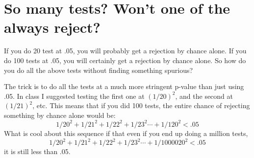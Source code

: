 \documentclass[12pt]{article}
\begin{document}
\section{So many tests?  Won't one of the always reject?}

If you do 20 test at .05, you will probably get a rejection by chance
alone.  If you do 100 tests at .05, you will certainly get a rejection
by chance alone.  So how do you do all the above tests without finding
something spurious?

The trick is to do all the tests at a much more stringent p-value than
just using .05.  In class I suggested testing the first one at
$(1/20)^2$, and the second at $(1/21)^2$, etc.  This means that if you
did 100 tests, the entire chance of rejecting something by chance
alone would be:
\begin{displaymath}
1/20^2 + 1/21^2 + 1/22^2 + 1/23^2 \cdots + 1/120^2 < .05
\end{displaymath}
What is cool about this sequence if that even if you end up doing a
million tests, 
\begin{displaymath}
1/20^2 + 1/21^2 + 1/22^2 + 1/23^2 \cdots + 1/1000020^2 < .05
\end{displaymath}
it is still less than .05.  
\end{document}
